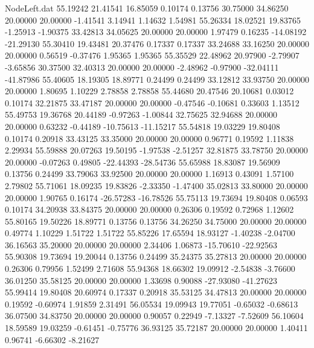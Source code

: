 \begin{filecontents}{NodeLeft.dat}
  55.19242   21.41541   16.85059     0.10174    0.13756   30.75000   34.86250   20.00000   20.00000   -1.41541    3.14941    1.14632    1.54981
  55.26334   18.02521   19.83765    -1.25913   -1.90375   33.42813   34.05625   20.00000   20.00000    1.97479    0.16235  -14.08192  -21.29130
  55.30410   19.43481   20.37476     0.17337    0.17337   33.24688   33.16250   20.00000   20.00000    0.56519   -0.37476    1.95365    1.95365
  55.35529   22.48962   20.97900    -2.79907   -3.65856   30.37500   32.40313   20.00000   20.00000   -2.48962   -0.97900  -32.04111  -41.87986
  55.40605   18.19305   18.89771     0.24499    0.24499   33.12812   33.93750   20.00000   20.00000    1.80695    1.10229    2.78858    2.78858
  55.44680   20.47546   20.10681     0.03012    0.10174   32.21875   33.47187   20.00000   20.00000   -0.47546   -0.10681    0.33603    1.13512
  55.49753   19.36768   20.44189    -0.97263   -1.00844   32.75625   32.94688   20.00000   20.00000    0.63232   -0.44189  -10.75613  -11.15217
  55.54818   19.03229   19.80408     0.10174    0.20918   33.43125   33.35000   20.00000   20.00000    0.96771    0.19592    1.11838    2.29934
  55.59888   20.07263   19.50195    -1.97538   -2.51257   32.81875   33.78750   20.00000   20.00000   -0.07263    0.49805  -22.44393  -28.54736
  55.65988   18.83087   19.56909     0.13756    0.24499   33.79063   33.92500   20.00000   20.00000    1.16913    0.43091    1.57100    2.79802
  55.71061   18.09235   19.83826    -2.33350   -1.47400   35.02813   33.80000   20.00000   20.00000    1.90765    0.16174  -26.57283  -16.78526
  55.75113   19.73694   19.80408     0.06593    0.10174   34.20938   33.84375   20.00000   20.00000    0.26306    0.19592    0.72968    1.12602
  55.80165   19.50226   18.89771     0.13756    0.13756   34.26250   34.75000   20.00000   20.00000    0.49774    1.10229    1.51722    1.51722
  55.85226   17.65594   18.93127    -1.40238   -2.04700   36.16563   35.20000   20.00000   20.00000    2.34406    1.06873  -15.70610  -22.92563
  55.90308   19.73694   19.20044     0.13756    0.24499   35.24375   35.27813   20.00000   20.00000    0.26306    0.79956    1.52499    2.71608
  55.94368   18.66302   19.09912    -2.54838   -3.76600   36.01250   35.58125   20.00000   20.00000    1.33698    0.90088  -27.93080  -41.27623
  55.99414   19.80408   20.60974     0.17337    0.20918   35.53125   34.47813   20.00000   20.00000    0.19592   -0.60974    1.91859    2.31491
  56.05534   19.09943   19.77051    -0.65032   -0.68613   36.07500   34.83750   20.00000   20.00000    0.90057    0.22949   -7.13327   -7.52609
  56.10604   18.59589   19.03259    -0.61451   -0.75776   36.93125   35.72187   20.00000   20.00000    1.40411    0.96741   -6.66302   -8.21627

\end{filecontents}
